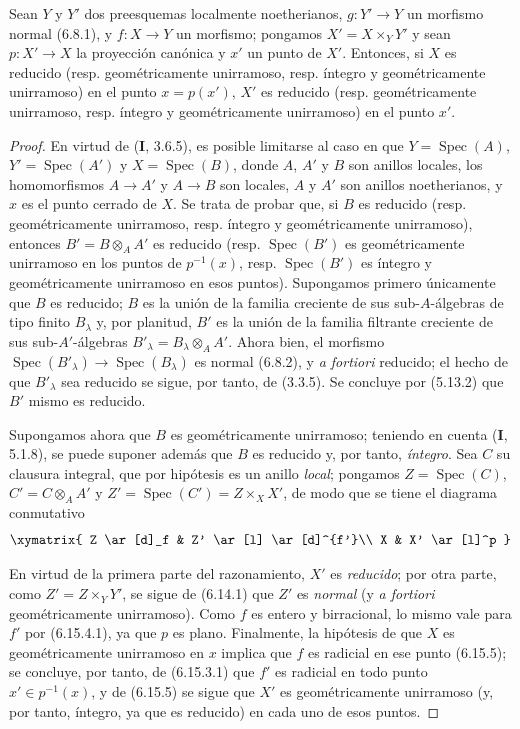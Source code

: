\begin{proposition}[6.15.10]
\label{IV.2.s6.15.10-fr}
Sean $Y$ y $Y'$ dos preesquemas localmente noetherianos,
$g:Y'\to Y$ un morfismo normal \textup{(6.8.1)}, y $f:X\to Y$ un
morfismo; pongamos $X'=X\times_Y Y'$ y sean $p:X'\to X$
la proyección canónica y $x'$ un punto de $X'$. Entonces,
si $X$ es reducido \textup{(resp.} geométricamente unirramoso,
\textup{resp.} íntegro y geométricamente unirramoso\textup{)} en el punto
$x=p(x')$, $X'$ es reducido \textup{(resp.} geométricamente
unirramoso, \textup{resp.} íntegro y geométricamente unirramoso\textup{)}
en el punto $x'$.
\end{proposition}

\begin{proof}
En virtud de (\textbf I, 3.6.5), es posible limitarse al caso en que
$Y=\operatorname{Spec}(A)$, $Y'=\operatorname{Spec}(A')$ y
$X=\operatorname{Spec}(B)$, donde $A$, $A'$ y $B$ son anillos
locales, los homomorfismos $A\to A'$ y $A\to B$ son locales,
$A$ y $A'$ son anillos noetherianos, y $x$ es el punto cerrado
de $X$. Se trata de probar que, si $B$ es reducido (resp.
geométricamente unirramoso, resp. íntegro y geométricamente
unirramoso), entonces $B'=B\otimes_A A'$ es reducido (resp.
$\operatorname{Spec}(B')$ es geométricamente unirramoso en
los puntos de $p^{-1}(x)$, resp. $\operatorname{Spec}(B')$
es íntegro y geométricamente unirramoso en esos puntos).
Supongamos primero únicamente que $B$ es reducido; $B$ es
la unión de la familia creciente de sus sub-$A$-álgebras
de tipo finito $B_\lambda$ y, por planitud, $B'$ es la unión
de la familia filtrante creciente de sus sub-$A'$-álgebras
$B'_\lambda=B_\lambda\otimes_A A'$. Ahora bien, el morfismo
$\operatorname{Spec}(B'_\lambda)\to\operatorname{Spec}(B_\lambda)$
es normal (6.8.2), y \emph{a fortiori} reducido; el hecho de
que $B'_\lambda$ sea reducido se sigue, por tanto, de (3.3.5).
Se concluye por (5.13.2) que $B'$ mismo es reducido.

Supongamos ahora que $B$ es geométricamente unirramoso;
teniendo en cuenta (\textbf{I}, 5.1.8), se puede suponer además que
$B$ es reducido y, por tanto, \emph{íntegro}. Sea $C$ su clausura
integral, que por hipótesis es un anillo \emph{local}; pongamos
$Z=\operatorname{Spec}(C)$, $C'=C\otimes_A A'$ y
$Z'=\operatorname{Spec}(C')=Z\times_X X'$, de modo que se
tiene el diagrama conmutativo
\[
\xymatrix{
Z \ar[d]_f & Z' \ar[l] \ar[d]^{f'}\\
X & X' \ar[l]^p
}
\]

En virtud de la primera parte del razonamiento, $X'$ es
\emph{reducido}; por otra parte, como $Z'=Z\times_Y Y'$, se sigue
de (6.14.1) que $Z'$ es \emph{normal} (y \emph{a fortiori}
geométricamente unirramoso). Como $f$ es entero y
birracional, lo mismo vale para $f'$ por (6.15.4.1), ya
que $p$ es plano. Finalmente, la hipótesis de que $X$ es
geométricamente unirramoso en $x$ implica que $f$ es
radicial en ese punto (6.15.5); se concluye, por tanto, de
(6.15.3.1) que $f'$ es radicial en todo punto
$x'\in p^{-1}(x)$, y de (6.15.5) se sigue que $X'$ es
geométricamente unirramoso (y, por tanto, íntegro, ya que
es reducido) en cada uno de esos puntos.
\end{proof}
